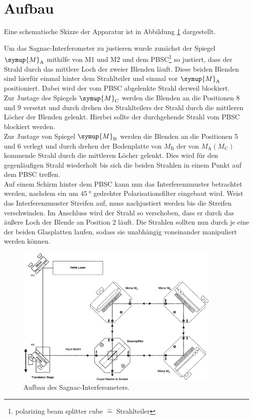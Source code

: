 \section{Aufbau}
\label{sec:Aufbau und Justage}

Eine schematische Skizze der Apparatur ist in
Abbildung \ref{fig:aufbau} dargestellt.

Um das Sagnac-Interferometer zu justieren wurde
zunächst der Spiegel $\symup{M}_{\text{A}}$ mithilfe von M1
und M2 und dem PBSC\footnote{polarizing beam
splitter cube $\hat{=}$ Strahlteiler} so justiert,
dass der Strahl durch das mittlere Loch der
zweier Blenden läuft. Diese beiden Blenden sind
hierfür einmal hinter dem Strahlteiler und einmal
vor $\symup{M}_{\text{A}}$ positioniert.
Dabei wird der vom PBSC abgelenkte Strahl derweil
blockiert.
\\
Zur Justage des Spiegels $\symup{M}_{\text{C}}$ werden die Blenden an
die Positionen 8 und 9 versetzt und durch drehen des
Strahlteilers der Strahl durch die mittleren Löcher
der Blenden gelenkt.
Hierbei sollte der durchgehende Strahl vom PBSC
blockiert werden.
\\
Zur Justage von Spiegel $\symup{M}_{\text{B}}$ werden die Blenden an
die Positionen 5 und 6 verlegt und durch drehen der
Bodenplatte von $M_{\text{B}}$ der von $M_{\text{A}} (M_{\text{C}})$
kommende Strahl durch die mittleren Löcher gelenkt.
Dies wird für den gegenläufigen Strahl wiederholt
bis sich die beiden Strahlen in einem Punkt auf dem
PBSC treffen.
\\
Auf einem Schirm hinter dem PBSC kann nun das
Interferenzmuster betrachtet werden, nachdem ein
um $\SI{45}{\degree}$ gedrehter Polarisationsfilter
eingebaut wird.
Weist das Interferenzmuster Streifen auf, muss
nachjustiert werden bis die Streifen verschwinden.
Im Anschluss wird der Strahl so verschoben, dass er
durch das äußere Loch der Blende an Position 2
läuft. Die Strahlen sollten nun durch je eine der
beiden Glasplatten laufen, sodass sie unabhängig
voneinander manipuliert werden können.

\begin{figure}
    \centering
    \includegraphics[width=0.9\textwidth]{pdf/aufbau.png}
    \caption{Aufbau des Sagnac-Interferometers.}
    \label{fig:aufbau}
\end{figure}

